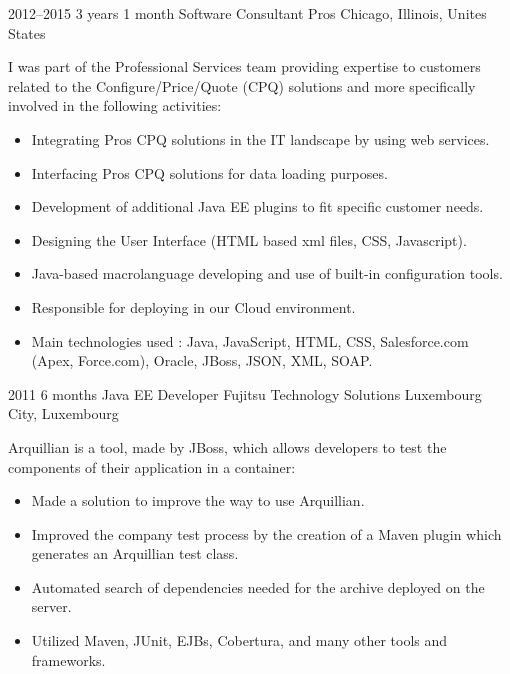 \documentclass[]{friggeri-cv} %
\begin{document}
\begin{entrylist}

\entry
{2012--2015}
{3 years 1 month}
{Software Consultant} 
{Pros}
{Chicago, Illinois, Unites States}
{I was part of the Professional Services team providing expertise to customers related to the
Configure/Price/Quote (CPQ) solutions and more specifically involved in the following activities:\\

\vspace{-4mm}
\begin{itemize}
	\item Integrating Pros CPQ solutions in the IT landscape by using web services.
	\item Interfacing Pros CPQ solutions for data loading purposes.
	\item Development of additional Java EE plugins to fit specific customer needs.
    \item Designing the User Interface (HTML based xml files, CSS, Javascript).
    \item Java-based macrolanguage developing and use of built-in configuration tools.
    \item Responsible for deploying in our Cloud environment.
    \item Main technologies used : Java, JavaScript, HTML, CSS, Salesforce.com (Apex, Force.com), Oracle, JBoss, JSON, XML, SOAP.
\end{itemize}}
\vspace{-7mm}

\end{entrylist}


\begin{entrylist}

\entry
{2011}
{6 months}
{Java EE Developer} 
{Fujitsu Technology Solutions}
{Luxembourg City, Luxembourg}
{Arquillian is a tool, made by JBoss, which allows developers to test the components of their
application in a container:\\

\vspace{-4mm}
\begin{itemize}
	\item Made a solution to improve the way to use Arquillian.
	\item Improved the company test process by the creation of a Maven plugin which generates an Arquillian test class.
	\item Automated search of dependencies needed for the archive deployed on the server.
    \item Utilized Maven, JUnit, EJBs, Cobertura, and many other tools and frameworks.
\end{itemize}}
\vspace{-7mm}

\end{entrylist}
\end{document}
